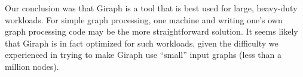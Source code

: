 Our conclusion was that Giraph is a tool that is best used for large, 
heavy-duty workloads. For simple graph processing, one machine and writing 
one's own graph processing code may be the more straightforward solution. It 
seems likely that Giraph is in fact optimized for such workloads, given the 
difficulty we experienced in trying to make Giraph use ``small'' input graphs 
(less than a million 
nodes).